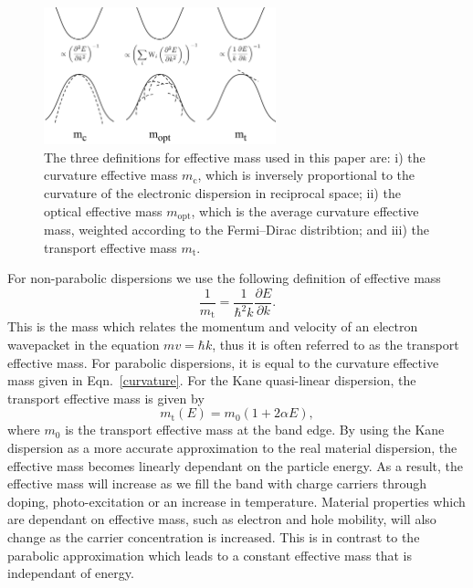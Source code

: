 \begin{figure}[tb] \centering
\includegraphics[width=0.6\textwidth]{./figures/ch4/effmass_schematic.pdf}
\caption[Schematic of the three definitions for effective mass]{\label{effmass_schematic} The three definitions for effective mass used in this paper are: i) the curvature effective mass $m_{\text{c}}$, which is inversely proportional to the curvature of the electronic dispersion in reciprocal space; ii) the optical effective mass $m_{\text{opt}}$, which is the average curvature effective mass, weighted according to the Fermi--Dirac distribtion; and iii) the transport effective mass $m_{\text{t}}$. }
\end{figure}

For non-parabolic dispersions we use the following definition of effective mass
\begin{equation} \label{transport}
\frac{1}{m_\text{t}} = \frac{1}{\hbar^2 k}\frac{\partial E}{\partial k}.
\end{equation}
This is the mass which relates the momentum and velocity of an electron wavepacket in the equation $mv = \hbar k$,\autocite{Ariel2012} thus it is often referred to as the transport effective mass.
For parabolic dispersions, it is equal to the curvature effective mass given in Eqn.\ \ref{curvature}. 
For the Kane quasi-linear dispersion, the transport effective mass is given by
\begin{equation} \label{kanemass}
m_\text{t}(E) = m_0(1+2 \alpha E),
\end{equation}
where $m_{0}$ is the transport effective mass at the band edge.\autocite{Segev2005} 
By using the Kane dispersion as a more accurate approximation to the real material dispersion, the effective mass becomes linearly dependant on the particle energy.
As a result, the effective mass will increase as we fill the band with charge carriers through doping, photo-excitation or an increase in temperature.\autocite{Riffe2002}
Material properties which are dependant on effective mass, such as electron and hole mobility, will also change as the carrier concentration is increased.
This is in contrast to the parabolic approximation which leads to a constant effective mass that is independant of energy.


